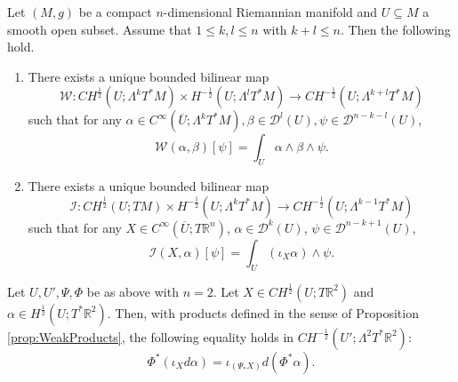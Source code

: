 \documentclass[10pt,a4paper]{amsart}
\newcommand{\R}{\mathbb{R}}
\begin{document}
    \begin{proposition} \label{prop:WeakProducts}
        Let $(M,g)$ be a compact $n$-dimensional Riemannian manifold and $U \subseteq M$ a smooth open subset. Assume that $1\leq k,l\leq n$ with $k+l \leq n$. Then the following hold.
        \begin{enumerate}
            \item[(i)] There exists a unique bounded bilinear map
            \begin{equation*}
                \mathcal{W} : CH^\frac12(U;\Lambda^kT^*M) \times H^{-\frac12}(U;\Lambda^l T^*M) \to CH^{-\frac12}(U;\Lambda^{k+l}T^*M)
            \end{equation*}
            such that for any $\alpha \in C^\infty(\overline U;\Lambda^k T^*M), \beta \in \mathcal{D}^l(U), \psi \in \mathcal{D}^{n-k-l}(U)$,
            \begin{equation*}
                \mathcal{W}(\alpha,\beta)[\psi] = \int_U \alpha \wedge \beta \wedge \psi.
            \end{equation*}
            \item[(ii)] There exists a unique bounded bilinear map
            \begin{equation*}
                \mathcal{I} : CH^\frac12(U;TM) \times H^{-\frac12}(U;\Lambda^k T^*M) \to CH^{-\frac12}(U;\Lambda^{k-1}T^*M)
            \end{equation*}
            such that for any $X \in C^\infty(\overline U; T\R^n)$, $\alpha \in \mathcal{D}^{k}(U)$, $\psi \in \mathcal{D}^{n-k+1}(U)$,
            \begin{equation*}
                \mathcal{I}(X,\alpha)[\psi] = \int_U (\iota_X \alpha) \wedge \psi.
            \end{equation*}
        \end{enumerate}
    \end{proposition}

    \begin{lemma} \label{lemma:pullback_commutation}
        Let $U,U',\Psi, \Phi$ be as above with $n=2$. Let $X \in CH^\frac12(U;T\R^2)$ and $\alpha \in H^\frac12(U;T^*\R^2)$. Then, with products defined in the sense of Proposition \ref{prop:WeakProducts}, the following equality holds in $CH^{-\frac12}(U';\Lambda^2 T^* \R^2)$:
        \begin{equation*}
            \Phi^*(\iota_{X}d\alpha) = \iota_{(\Psi_*X)} d(\Phi^*\alpha).
        \end{equation*}
    \end{lemma}
\end{document}
